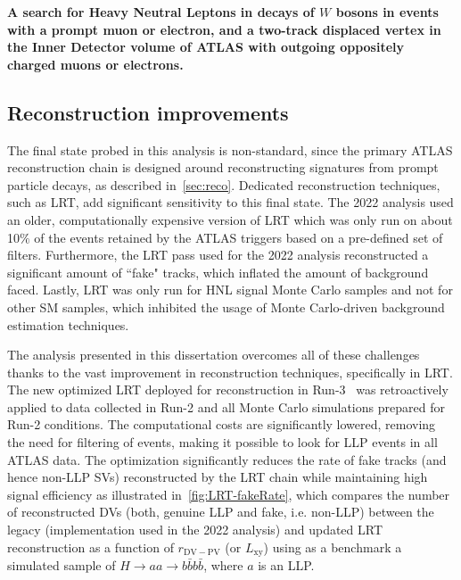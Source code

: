 \textbf{A search for Heavy Neutral Leptons in decays of $W$ bosons in events with a prompt muon or electron, and a two-track displaced vertex in the Inner Detector volume of ATLAS with outgoing oppositely charged muons or electrons.}

\subsection{Reconstruction improvements}
The final state probed in this analysis is non-standard, since the primary ATLAS reconstruction chain is designed around reconstructing signatures from prompt particle decays, as described in~\cref{sec:reco}. Dedicated reconstruction techniques, such as LRT, add significant sensitivity to this final state. The 2022 analysis used an older, computationally expensive version of LRT which was only run on about 10$\%$ of the events retained by the ATLAS triggers based on a pre-defined set of filters. Furthermore, the LRT pass used for the 2022 analysis reconstructed a significant amount of ``fake" tracks, which inflated the amount of background faced. Lastly, LRT was only run for HNL signal Monte Carlo samples and not for other SM samples, which inhibited the usage of Monte Carlo-driven background estimation techniques. 

The analysis presented in this dissertation overcomes all of these challenges thanks to the vast improvement in reconstruction techniques, specifically in LRT. The new optimized LRT deployed for reconstruction in Run-3~\cite{IDTR-2021-03} was retroactively applied to data collected in Run-2 and all Monte Carlo simulations prepared for Run-2 conditions. The computational costs are significantly lowered, removing the need for filtering of events, making it possible to look for LLP events in all ATLAS data. The optimization significantly reduces the rate of fake tracks (and hence non-LLP SVs) reconstructed by the LRT chain while maintaining high signal efficiency as illustrated in~\cref{fig:LRT-fakeRate}, which compares the number of reconstructed DVs (both, genuine LLP and fake, i.e. non-LLP) between the legacy (implementation used in the 2022 analysis) and updated LRT reconstruction as a function of $r_\mathrm{DV-PV}$ (or $L_\mathrm{xy}$) using as a benchmark a simulated sample of $H\rightarrow aa \rightarrow b\bar{b}b\bar{b}$, where $a$ is an LLP.

